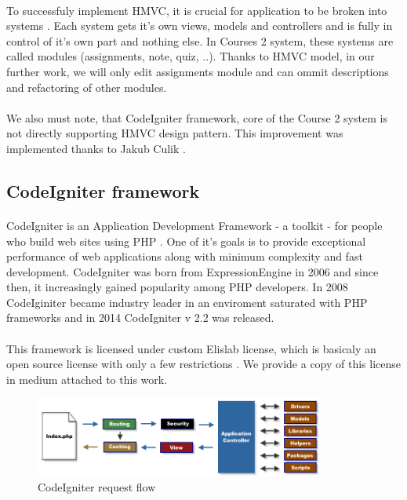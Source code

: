 \paragraph{}
To successfuly implement HMVC, it is crucial for application to be broken into systems \cite{hmvc}. Each system gets it's own views, models and controllers and is fully in control of it's own part and nothing else. In Courses 2 system, these systems are called modules (assignments, note, quiz, ..). Thanks to HMVC model, in our further work, we will only edit assignments module and can ommit descriptions and refactoring of other modules.

\paragraph{}
We also must note, that CodeIgniter framework, core of the Course 2 system is not directly supporting HMVC design pattern. This improvement was implemented thanks to Jakub Culik \cite{culik}.


\subsection{CodeIgniter framework}
\paragraph{}
CodeIgniter is an Application Development Framework - a toolkit - for people who build web sites using PHP  \cite{codeigniter}. One of it's goals is to provide exceptional performance of web applications along with minimum complexity and fast development. CodeIgniter was born from ExpressionEngine \cite{elislab} in 2006 and since then, it increasingly gained popularity among PHP developers. In 2008 CodeIginiter became industry leader in an enviroment saturated with PHP frameworks \cite{elislab} and in 2014 CodeIgniter v 2.2 was released.

\paragraph{}
This framework is licensed under custom Elislab license, which is basicaly an open source license with only a few restrictions \cite{elislablicense}. We provide a copy of this license in medium attached to this work.


\begin{figure}[h]
    \centering
    \includegraphics[width=0.85\textwidth]{courses/codeigniter.png}
    \caption{CodeIgniter request flow}
    \label{codeigniter_flow}
\end{figure}


